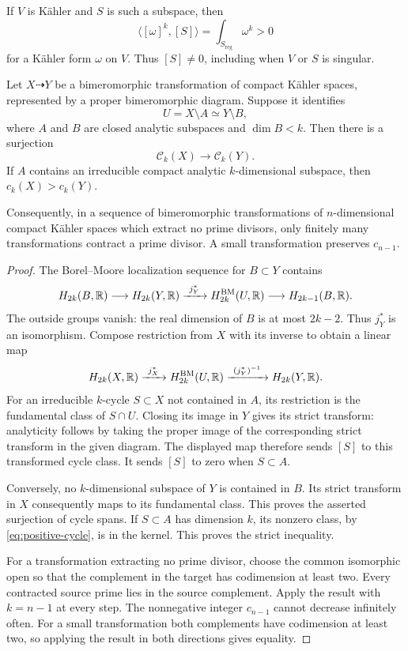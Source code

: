 If $V$ is K\"ahler and $S$ is such a subspace, then
\begin{equation}\label{eq:positive-cycle}
 \langle[\omega]^k,[S]\rangle=\int_{S_{\mathrm{reg}}}\omega^k>0
\end{equation}
for a K\"ahler form $\omega$ on $V$.  Thus $[S]\neq 0$, including when
$V$ or $S$ is singular.

\begin{lemma}\label{lem:cycle-loss}
Let $X\dashrightarrow Y$ be a bimeromorphic transformation of compact
K\"ahler spaces, represented by a proper bimeromorphic diagram.
Suppose it identifies
\[
 U=X\setminus A\simeq Y\setminus B,
\]
where $A$ and $B$ are closed analytic subspaces and $\dim B<k$.
Then there is a surjection
\[
 \mathcal C_k(X)\longrightarrow\mathcal C_k(Y).
\]
If $A$ contains an irreducible compact analytic $k$-dimensional subspace,
then $c_k(X)>c_k(Y)$.

Consequently, in a sequence of bimeromorphic transformations of
$n$-dimensional compact K\"ahler spaces which extract no prime divisors,
only finitely many transformations contract a prime divisor.  A small
transformation preserves $c_{n-1}$.
\end{lemma}

\begin{proof}
The Borel--Moore localization sequence for $B\subset Y$ contains
\[
 H_{2k}(B,\mathbb R)\longrightarrow H_{2k}(Y,\mathbb R)
 \xrightarrow{\ j_Y^*\ }H_{2k}^{\mathrm{BM}}(U,\mathbb R)
 \longrightarrow H_{2k-1}(B,\mathbb R).
\]
The outside groups vanish: the real dimension of $B$ is at most $2k-2$.
Thus $j_Y^*$ is an isomorphism.  Compose restriction from $X$ with its
inverse to obtain a linear map
\[
 H_{2k}(X,\R)\xrightarrow{\ j_X^*\ }H_{2k}^{\mathrm{BM}}(U,\R)
 \xrightarrow{\ (j_Y^*)^{-1}\ }H_{2k}(Y,\R).
\]
For an irreducible $k$-cycle $S\subset X$ not contained in $A$, its
restriction is the fundamental class of $S\cap U$.  Closing its image in
$Y$ gives its strict transform: analyticity follows by taking the proper
image of the corresponding strict transform in the given diagram.
The displayed map therefore sends $[S]$ to this transformed cycle class.
It sends $[S]$ to zero when $S\subset A$.

Conversely, no $k$-dimensional subspace of $Y$ is contained in $B$.
Its strict transform in $X$ consequently maps to its fundamental class.
This proves the asserted surjection of cycle spans.  If $S\subset A$
has dimension $k$, its nonzero class, by \eqref{eq:positive-cycle}, is
in the kernel.  This proves the strict inequality.

For a transformation extracting no prime divisor, choose the common
isomorphic open so that the complement in the target has codimension
at least two.  Every contracted source prime lies in the source
complement.  Apply the result with $k=n-1$ at every step.  The
nonnegative integer $c_{n-1}$ cannot decrease infinitely often.  For a
small transformation both complements have codimension at least two,
so applying the result in both directions gives equality.
\end{proof}


